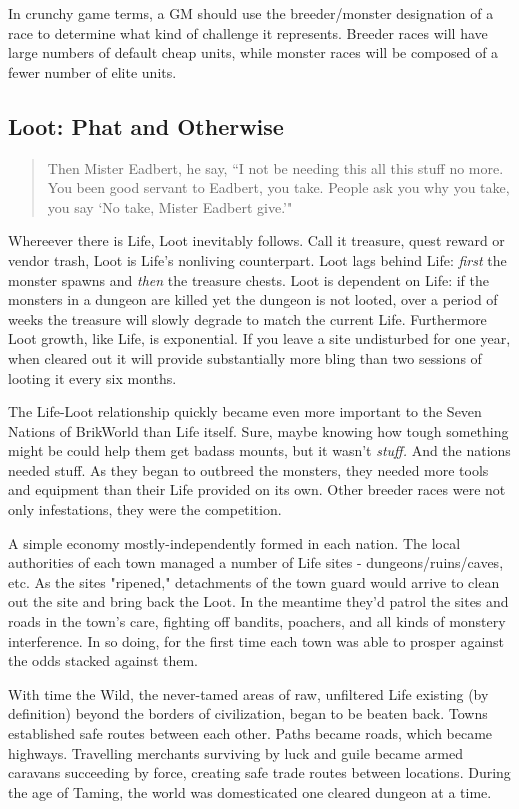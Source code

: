 \documentclass[12pt,a4paper,twocolumn]{article}
\begin{document}
In crunchy game terms, a GM should use the breeder/monster designation of a race to determine what kind of challenge it represents.  Breeder races will have large numbers of default cheap units, while monster races will be composed of a fewer number of elite units.
\subsection{Loot: Phat and Otherwise}
\begin{quote}
Then Mister Eadbert, he say, ``I not be needing this all this stuff no more.  You been good servant to Eadbert, you take.  People ask you why you take, you say `No take, Mister Eadbert give.'"
\end{quote}

Whereever there is Life, Loot inevitably follows.  Call it treasure, quest reward or vendor trash, Loot is Life's nonliving counterpart.  Loot lags behind Life: {\em first} the monster spawns and {\em then} the treasure chests.  Loot is dependent on Life: if the monsters in a dungeon are killed yet the dungeon is not looted, over a period of weeks the treasure will slowly degrade to match the current Life.  Furthermore Loot growth, like Life, is exponential.  If you leave a site undisturbed for one year, when cleared out it will provide substantially more bling than two sessions of looting it every six months.

The Life-Loot relationship quickly became even more important to the Seven Nations of BrikWorld than Life itself.  Sure, maybe knowing how tough something might be could help them get badass mounts, but it wasn't {\em stuff.}  And the nations needed stuff.  As they began to outbreed the monsters, they needed more tools and equipment than their Life provided on its own.  Other breeder races were not only infestations, they were the competition.

A simple economy mostly-independently formed in each nation.  The local authorities of each town managed a number of Life sites - dungeons/ruins/caves, etc.  As the sites "ripened," detachments of the town guard would arrive to clean out the site and bring back the Loot.  In the meantime they'd patrol the sites and roads in the town's care, fighting off bandits, poachers, and all kinds of monstery interference.  In so doing, for the first time each town was able to prosper against the odds stacked against them.

With time the Wild, the never-tamed areas of raw, unfiltered Life existing (by definition) beyond the borders of civilization, began to be beaten back.  Towns established safe routes between each other.  Paths became roads, which became highways.  Travelling merchants surviving by luck and guile became armed caravans succeeding by force, creating safe trade routes between locations.  During the age of Taming, the world was domesticated one cleared dungeon at a time.
\end{document}
